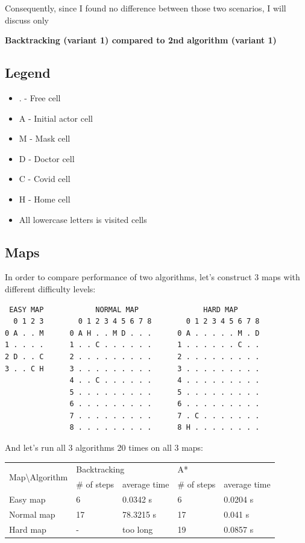 \documentclass{article}
\begin{document}
Consequently, since I found no difference between those two scenarios, I will discuss only

\textbf{Backtracking (variant 1) compared to 2nd algorithm (variant 1)}


\subsection{Legend}
\begin{itemize}
    \item . - Free cell
    \item A - Initial actor cell
    \item M - Mask cell 
    \item D - Doctor cell
    \item C - Covid cell
    \item H - Home cell
    \item All lowercase letters is visited cells
\end{itemize}
\subsection{Maps}
In order to compare performance of two algorithms, let's construct 3 maps with different difficulty levels:
\\

\begin{verbatim}
 EASY MAP            NORMAL MAP               HARD MAP
  0 1 2 3        0 1 2 3 4 5 6 7 8        0 1 2 3 4 5 6 7 8
0 A . . M      0 A H . . M D . . .      0 A . . . . . M . D
1 . . . .      1 . . C . . . . . .      1 . . . . . . C . .
2 D . . C      2 . . . . . . . . .      2 . . . . . . . . .
3 . . C H      3 . . . . . . . . .      3 . . . . . . . . .
               4 . . C . . . . . .      4 . . . . . . . . .
               5 . . . . . . . . .      5 . . . . . . . . .
               6 . . . . . . . . .      6 . . . . . . . . .
               7 . . . . . . . . .      7 . C . . . . . . .
               8 . . . . . . . . .      8 H . . . . . . . . 
\end{verbatim}

And let's run all 3 algorithms 20 times on all 3 maps:
\begin{center}
    

\begin{tabular}{|l|l|l|l|l|}
\hline
\multirow{2}{*}{Map\textbackslash{}Algorithm} & \multicolumn{2}{l|}{Backtracking} & \multicolumn{2}{l|}{A*} \\ \cline{2-5} 
                                              & \# of steps         & average time & \# of steps    & average time\\ \hline
Easy map                                      & 6                   &0.0342 s     & 6              &0.0204 s \\ \hline
Normal map                                    & 17                 & 78.3215 s    & 17             &0.041 s        \\ \hline
Hard map                                      &-&too long&19&0.0857 s\\ \hline
\end{tabular}
\end{center}
\end{document}
